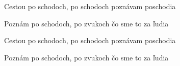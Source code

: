\begin{song}
\bigskip

Cestou po schodoch, po schodoch poznávam poschodia \par
Poznám po schodoch, po zvukoch čo sme to za ľudia \par
Cestou po schodoch, po schodoch poznávam poschodia \par
Poznám po schodoch, po zvukoch čo sme to za ľudia \par

\end{song}
